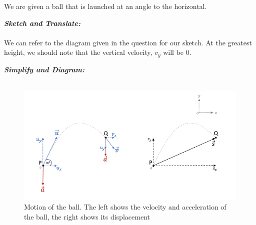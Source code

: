 %
%
%


\begin{subquestions}

We are given a ball that is launched at an angle to the horizontal.
	
\subquestion
	
\textbf{\textit{Sketch and Translate:}} \\ \\
We can refer to the diagram given in the question for our sketch. At the greatest height, we should note that the vertical velocity, $v_y$ will be 0.




\textbf{\textit{Simplify and Diagram:}} \\ \\ 
\begin{figure}[H] 
	\begin{center}
		\hspace{20pt}\includegraphics[scale=1.2]{../2005/figures/2005q6-Diagram1}
		\caption{\label{2005:q6:Diagram1} Motion of the ball. The left shows the velocity and acceleration of the ball, the right shows its displacement}
	\end{center}
\end{figure}


\end{subquestions}
